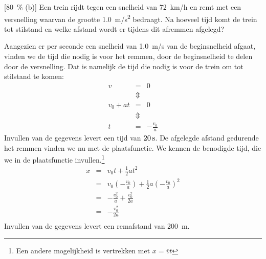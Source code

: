 
\begin{exercise}


[\SI{80}{\percent} (b)] Een trein rijdt tegen een snelheid van \SI{72}{km/h} en remt met een versnelling waarvan de grootte \SI{1,0}{m/s^2} bedraagt. Na hoeveel tijd komt de trein tot stilstand en welke afstand wordt er tijdens dit afremmen afgelegd?

\begin{oplossing}
    Aangezien er per seconde een snelheid van \SI{1,0}{m/s} van de beginsnelheid afgaat, vinden we de tijd die nodig is voor het remmen, door de beginsnelheid te delen door de versnelling. Dat is namelijk de tijd die nodig is voor de trein om tot stilstand te komen:
    \begin{eqnarray*}
        v&=&0\\
        &\Updownarrow&\\
        v_0+at&=&0\\
        &\Updownarrow&\\
        t&=&-\frac{v_0}{a}
    \end{eqnarray*}
    Invullen van de gegevens levert een tijd van $20\rm\,s$. De afgelegde afstand gedurende het remmen vinden we nu met de plaatsfunctie. We kennen de benodigde tijd, die we in de plaatsfunctie invullen.\footnote{Een andere mogelijkheid is vertrekken met $x=\overline{v}t$}
    \begin{eqnarray*}
        x&=&v_0t+\frac{1}{2}at^2\\
        &=&v_0\left(-\frac{v_0}{a}\right)+\frac{1}{2}a\left(-\frac{v_0}{a}\right)^2\\
        &=&-\frac{v_0^2}{a}+\frac{v_0^2}{2a}\\
        &=&-\frac{v_0^2}{2a}\\
    \end{eqnarray*}
    Invullen van de gegevens levert een remafstand van \SI{200}{m}. 
\end{oplossing}

\end{exercise}
